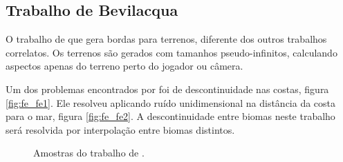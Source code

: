 \subsection{Trabalho de Bevilacqua}
O trabalho de \cite{fernando2009costas} que gera bordas para terrenos, diferente dos 
outros trabalhos correlatos. Os terrenos são gerados com tamanhos
pseudo-infinitos, calculando aspectos apenas do terreno perto do jogador ou câmera.

Um dos problemas encontrados por \cite{fernando2009costas} foi de descontinuidade %
nas costas, figura \ref{fig:fe_fe1}. Ele resolveu aplicando ruído unidimensional na distância da costa
para o mar, figura \ref{fig:fe_fe2}. A descontinuidade entre biomas neste trabalho será resolvida por interpolação 
entre biomas distintos.

\begin{figure}[H]
     \centering
     \hspace{0.1cm}
     \caption{Amostras do trabalho de \cite{fernando2009costas}.}
     \label{fig:fefefefefe}
\end{figure}